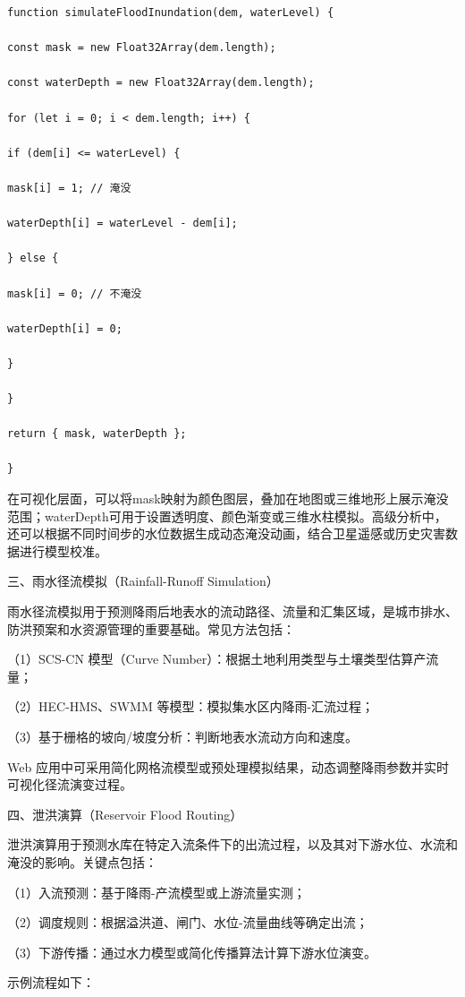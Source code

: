 \begin{lstlisting}
function simulateFloodInundation(dem, waterLevel) {

const mask = new Float32Array(dem.length);

const waterDepth = new Float32Array(dem.length);

for (let i = 0; i < dem.length; i++) {

if (dem[i] <= waterLevel) {

mask[i] = 1; // 淹没

waterDepth[i] = waterLevel - dem[i];

} else {

mask[i] = 0; // 不淹没

waterDepth[i] = 0;

}

}

return { mask, waterDepth };

}
\end{lstlisting}

在可视化层面，可以将mask映射为颜色图层，叠加在地图或三维地形上展示淹没范围；waterDepth可用于设置透明度、颜色渐变或三维水柱模拟。高级分析中，还可以根据不同时间步的水位数据生成动态淹没动画，结合卫星遥感或历史灾害数据进行模型校准。

三、雨水径流模拟（Rainfall-Runoff Simulation）

雨水径流模拟用于预测降雨后地表水的流动路径、流量和汇集区域，是城市排水、防洪预案和水资源管理的重要基础。常见方法包括：

（1）SCS-CN 模型（Curve Number）：根据土地利用类型与土壤类型估算产流量；

（2）HEC-HMS、SWMM 等模型：模拟集水区内降雨-汇流过程；

（3）基于栅格的坡向/坡度分析：判断地表水流动方向和速度。

Web 应用中可采用简化网格流模型或预处理模拟结果，动态调整降雨参数并实时可视化径流演变过程。

四、泄洪演算（Reservoir Flood Routing）

泄洪演算用于预测水库在特定入流条件下的出流过程，以及其对下游水位、水流和淹没的影响。关键点包括：

（1）入流预测：基于降雨-产流模型或上游流量实测；

（2）调度规则：根据溢洪道、闸门、水位-流量曲线等确定出流；

（3）下游传播：通过水力模型或简化传播算法计算下游水位演变。

示例流程如下：

